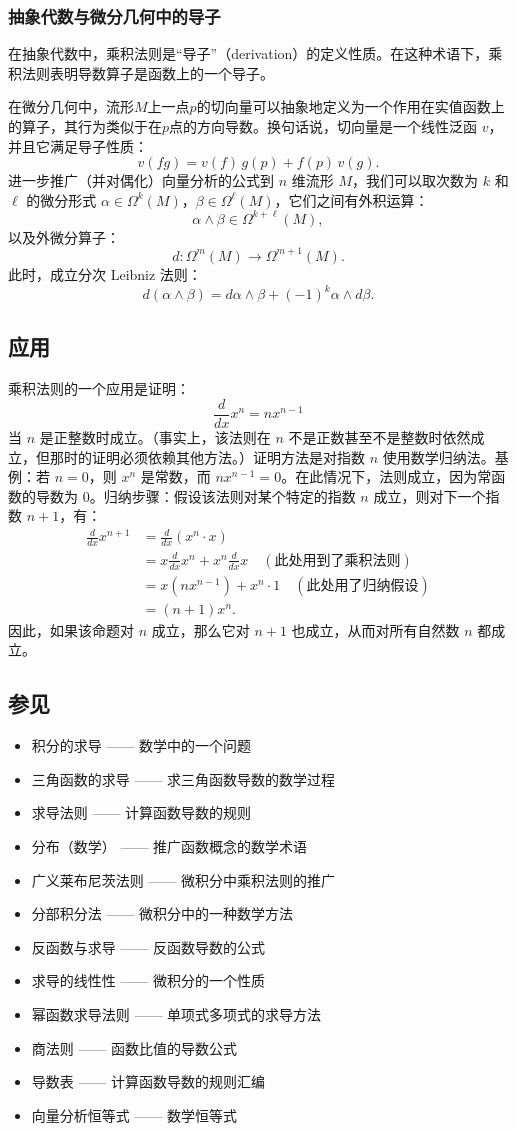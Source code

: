 \subsubsection{抽象代数与微分几何中的导子}
在抽象代数中，乘积法则是“导子”（derivation）的定义性质。在这种术语下，乘积法则表明导数算子是函数上的一个导子。

在微分几何中，流形$M$上一点$p$的切向量可以抽象地定义为一个作用在实值函数上的算子，其行为类似于在$p$点的方向导数。换句话说，切向量是一个线性泛函 $v$，并且它满足导子性质：
$$
v(fg) = v(f)\, g(p) + f(p)\, v(g).~
$$
进一步推广（并对偶化）向量分析的公式到 $n$ 维流形 $M$，我们可以取次数为 $k$ 和 $\ell$ 的微分形式 $\alpha \in \Omega^k(M)$，$\beta \in \Omega^\ell(M)$，它们之间有外积运算：
$$
\alpha \wedge \beta \in \Omega^{k+\ell}(M),~
$$
以及外微分算子：
$$
d : \Omega^m(M) \to \Omega^{m+1}(M).~
$$
此时，成立分次 Leibniz 法则：
$$
d(\alpha \wedge \beta) = d\alpha \wedge \beta + (-1)^k \alpha \wedge d\beta.~
$$
\subsection{应用}
乘积法则的一个应用是证明：
$$
\frac{d}{dx} x^n = n x^{n-1}~
$$
当 $n$ 是正整数时成立。（事实上，该法则在 $n$ 不是正数甚至不是整数时依然成立，但那时的证明必须依赖其他方法。）证明方法是对指数 $n$ 使用数学归纳法。基例：若 $n=0$，则 $x^n$ 是常数，而 $n x^{n-1} = 0$。在此情况下，法则成立，因为常函数的导数为 0。归纳步骤：假设该法则对某个特定的指数 $n$ 成立，则对下一个指数 $n+1$，有：
$$
\begin{aligned}
\frac{d}{dx} x^{n+1} 
&= \frac{d}{dx}(x^n \cdot x) \\
&= x \frac{d}{dx} x^n + x^n \frac{d}{dx} x \quad (\text{此处用到了乘积法则})\\
&= x \left( n x^{n-1} \right) + x^n \cdot 1 \quad (\text{此处用了归纳假设})\\
&= (n+1) x^n.~
\end{aligned}~
$$
因此，如果该命题对 $n$ 成立，那么它对 $n+1$ 也成立，从而对所有自然数 $n$ 都成立。
\subsection{参见}
\begin{itemize}
\item 积分的求导 —— 数学中的一个问题
\item 三角函数的求导 —— 求三角函数导数的数学过程
\item 求导法则 —— 计算函数导数的规则
\item 分布（数学） —— 推广函数概念的数学术语
\item 广义莱布尼茨法则 —— 微积分中乘积法则的推广
\item 分部积分法 —— 微积分中的一种数学方法
\item 反函数与求导 —— 反函数导数的公式
\item 求导的线性性 —— 微积分的一个性质
\item 幂函数求导法则 —— 单项式多项式的求导方法
\item 商法则 —— 函数比值的导数公式
\item 导数表 —— 计算函数导数的规则汇编
\item 向量分析恒等式 —— 数学恒等式
\end{itemize}
